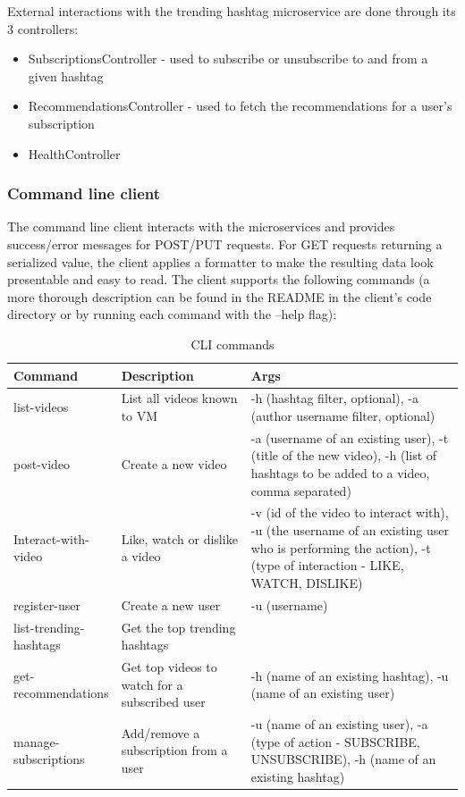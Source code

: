 \documentclass[parskip=full]{article}
\begin{document}
    External interactions with the trending hashtag microservice are done through its 3 controllers:

    \begin{itemize}
        \item SubscriptionsController - used to subscribe or unsubscribe to and from a given hashtag
        \item RecommendationsController - used to fetch the recommendations for a user's subscription
        \item HealthController
    \end{itemize}

    \subsubsection{Command line client}
    The command line client interacts with the microservices and provides success/error messages for POST/PUT requests.
    For GET requests returning a serialized value, the client applies a formatter to make the resulting data look presentable and easy to read.
    The client supports the following commands (a more thorough description can be found in the README in the client's code directory or by running each command with the --help flag):

    \begin{table}[h]
        \centering
        \begin{tabular}{|p{0.2\linewidth}|p{0.3\linewidth}|p{0.5\linewidth}|}
            \toprule
            \textbf{Command} & \textbf{Description} & \textbf{Args} \\
            \midrule
            list-videos & List all videos known to VM & -h (hashtag filter, optional), -a (author username filter, optional) \\
            post-video & Create a new video & -a (username of an existing user), -t (title of the new video), -h (list of hashtags to be added to a video, comma separated) \\
            Interact-with-video & Like, watch or dislike a video & -v (id of the video to interact with), -u (the username of an existing user who is performing the action), -t (type of interaction - LIKE, WATCH, DISLIKE) \\
            register-user & Create a new user & -u (username) \\
            list-trending-hashtags & Get the top trending hashtags &  \\
            get-recommendations & Get top videos to watch for a subscribed user & -h (name of an existing hashtag), -u (name of an existing user) \\
            manage-subscriptions & Add/remove a subscription from a user & -u (name of an existing user), -a (type of action - SUBSCRIBE, UNSUBSCRIBE), -h (name of an existing hashtag) \\
            \bottomrule
        \end{tabular}
        \caption{CLI commands}
        \label{tab:cli-commands}
    \end{table}
\end{document}
